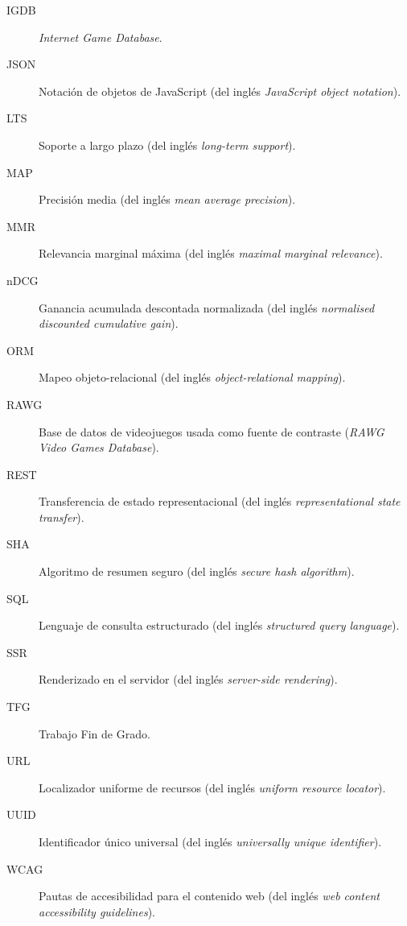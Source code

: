 \begin{description}
    \item[IGDB] \textit{Internet Game Database}.
    \item[JSON] Notación de objetos de JavaScript (del inglés \textit{JavaScript object notation}).
    \item[LTS] Soporte a largo plazo (del inglés \textit{long-term support}).
    \item[MAP] Precisión media (del inglés \textit{mean average precision}).
    \item[MMR] Relevancia marginal máxima (del inglés \textit{maximal marginal relevance}).
    \item[nDCG] Ganancia acumulada descontada normalizada (del inglés \textit{normalised discounted cumulative gain}).
    \item[ORM] Mapeo objeto-relacional (del inglés \textit{object-relational mapping}).
    \item[RAWG] Base de datos de videojuegos usada como fuente de contraste (\textit{RAWG Video Games Database}).
    \item[REST] Transferencia de estado representacional (del inglés \textit{representational state transfer}).
    \item[SHA] Algoritmo de resumen seguro (del inglés \textit{secure hash algorithm}).
    \item[SQL] Lenguaje de consulta estructurado (del inglés \textit{structured query language}).
    \item[SSR] Renderizado en el servidor (del inglés \textit{server-side rendering}).
    \item[TFG] Trabajo Fin de Grado.
    \item[URL] Localizador uniforme de recursos (del inglés \textit{uniform resource locator}).
    \item[UUID] Identificador único universal (del inglés \textit{universally unique identifier}).
    \item[WCAG] Pautas de accesibilidad para el contenido web (del inglés \textit{web content accessibility guidelines}).
\end{description}
